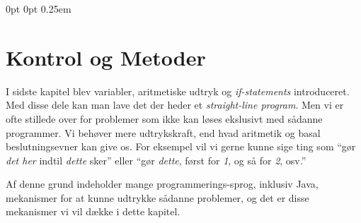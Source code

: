 
%

{0pt}%
{0pt}%
{\normalfont}%
{}%
{\small\bf\sffamily\color{red}}%
{\;}%
{0.25em}%
{\small\sffamily\color{red}%
	}

\theoremstyle{redbox}
\newtheorem{todoT}{TODO}


\newcommand{\todo}[1]{
	\begin{todoBox}\begin{todoT}
		#1
	\end{todoT}\end{todoBox}
}


\chapter{Kontrol og Metoder}

	I sidste kapitel blev variabler, aritmetiske udtryk og \emph{if-statements}
	introduceret. Med disse dele kan man lave det der heder et
	\emph{straight-line program}. Men vi er ofte stillede over for problemer som
	ikke kan løses ekslusivt med sådanne programmer. Vi behøver mere
	udtrykskraft, end hvad aritmetik og basal beslutningsevner kan give os.
	For eksempel vil vi gerne kunne sige ting som ``gør \emph{det her} indtil
	\emph{dette} sker'' eller ``gør \emph{dette}, først for \emph{1}, og så for
	\emph{2}, osv.''

	Af denne grund indeholder mange programmerings-sprog, inklusiv Java,
	mekanismer for at kunne udtrykke sådanne problemer, og det er disse
	mekanismer vi vil dække i dette kapitel.

